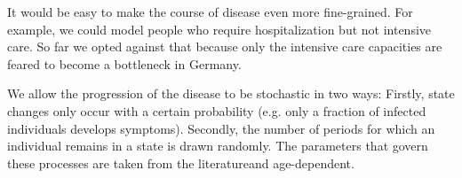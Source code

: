 It would be easy to make the course of disease even more fine-grained. For example, we
could model people who require hospitalization but not intensive care. So far we opted
against that because only the intensive care capacities are feared to become a
bottleneck in Germany.

We allow the progression of the disease to be stochastic in two ways: Firstly, state
changes only occur with a certain probability (e.g. only a fraction of infected
individuals develops symptoms). Secondly, the number of periods for which an individual
remains in a state is drawn randomly. The parameters that govern these processes are
taken from the literature\footnotemark and age-dependent.

